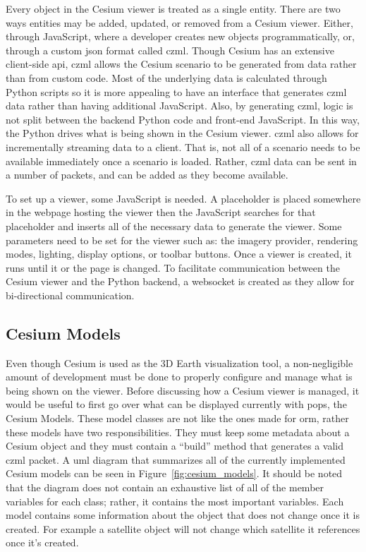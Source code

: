 Every object in the Cesium viewer is treated as a single entity. There are two
ways entities may be added, updated, or removed from a Cesium viewer. Either,
through JavaScript, where a developer creates new objects programmatically, or,
through a custom \gls{json} format called \gls{czml}. Though Cesium has an
extensive client-side \gls{api}, \gls{czml} allows the Cesium scenario to be
generated from data rather than from custom code. Most of the underlying data
is calculated through Python scripts so it is more appealing to have an
interface that generates \gls{czml} data rather than having additional
JavaScript. Also, by generating \gls{czml}, logic is not split between the
backend Python code and front-end JavaScript. In this way, the Python drives
what is being shown in the Cesium viewer. \gls{czml} also allows for
incrementally streaming data to a client. That is, not all of a scenario needs
to be available immediately once a scenario is loaded. Rather, \gls{czml} data
can be sent in a number of packets, and can be added as they become available.

To set up a viewer, some JavaScript is needed. A placeholder is placed
somewhere in the webpage hosting the viewer then the JavaScript searches for
that placeholder and inserts all of the necessary data to generate the viewer.
Some parameters need to be set for the viewer such as: the imagery provider,
rendering modes, lighting, display options, or toolbar buttons. Once a viewer
is created, it runs until it or the page is changed.  To facilitate
communication between the Cesium viewer and the Python backend, a websocket is
created as they allow for bi-directional communication. 

\subsection{Cesium Models}\label{sec:cesium-models}

Even though Cesium is used as the 3D Earth visualization tool, a
non-negligible amount of development must be done to properly configure and
manage what is being shown on the viewer. Before discussing how a Cesium viewer
is managed, it would be useful to first go over what can be displayed currently
with \gls{pops}, the Cesium Models. These model classes are not like the ones
made for \gls{orm}, rather these models have two responsibilities. They must
keep some metadata about a Cesium object and they must contain a ``build''
method that generates a valid \gls{czml} packet.  A \gls{uml} diagram that
summarizes all of the currently implemented Cesium models can be seen in
Figure~\ref{fig:cesium_models}. It should be noted that the diagram does not
contain an exhaustive list of all of the member variables for each class;
rather, it contains the most important variables.  Each model contains some
information about the object that does not change once it is created. For
example a satellite object will not change which satellite it references once
it's created. 

